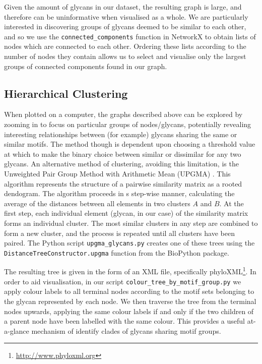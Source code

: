 \documentclass[12pt,a4paper]{article}
\begin{document}
Given the amount of glycans in our dataset, the resulting graph is large, and therefore can be uninformative when visualised as a whole. We are particularly interested in discovering groups of glycans deemed to be similar to each other, and so we use the \texttt{connected\_components} function in NetworkX to obtain lists of nodes which are connected to each other. Ordering these lists according to the number of nodes they contain allows us to select and visualise only the largest groups of connected components found in our graph. 

\subsection{Hierarchical Clustering}
\label{sec:clustering}

When plotted on a computer, the graphs described above can be explored by zooming in to focus on particular groups of nodes/glycans, potentially revealing interesting relationships between (for example) glycans sharing the same or similar motifs. The method though is dependent upon choosing a threshold value at which to make the binary choice between similar or dissimilar for any two glycans. An alternative method of clustering, avoiding this limitation, is the Unweighted Pair Group Method with Arithmetic Mean (UPGMA) \citep{gronau2007optimal}. This algorithm represents the structure of a pairwise similarity matrix as a rooted dendogram. The algorithm proceeds in s step-wise manner, calculating the average of the distances between all elements in two clusters $A$ and $B$. At the first step, each individual element (glycan, in our case) of the similarity matrix forms an individual cluster. The most similar clusters in any step are combined to form a new cluster, and the process is repeated until all clusters have been paired. The Python script \texttt{upgma\_glycans.py} creates one of these trees using the \texttt{DistanceTreeConstructor.upgma} function from the BioPython package.

The resulting tree is given in the form of an XML file, specifically phyloXML\footnote{\url{http://www.phyloxml.org}}. In order to aid visualisation, in our script \texttt{colour\_tree\_by\_motif\_group.py} we apply colour labels to all terminal nodes according to the motif sets belonging to the glycan represented by each node. We then traverse the tree from the terminal nodes upwards, applying the same colour labels if and only if the two children of a parent node have been labelled with the same colour. This provides a useful at-a-glance mechanism of identify clades of glycans sharing motif groups.
\end{document}
